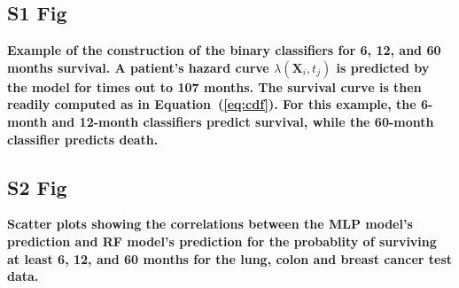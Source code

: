 \documentclass[10pt,letterpaper]{article}
\begin{document}
\subsection*{S1 Fig}
\label{S1_Fig}
{\bf Example of the construction of the binary classifiers for 6, 12, and 60 months survival.
A patient's hazard curve $\lambda(\mathbf{X}_{i}, t_{j})$ is predicted by the model for times out to 107 months. The survival curve is then readily computed as in Equation~(\ref{eq:cdf}). For this example, the 6-month and 12-month classifiers predict survival, while the 60-month classifier predicts death.}


\subsection*{S2 Fig}
\label{S2_Fig}
{\bf Scatter plots showing the correlations between the MLP model's prediction and RF model's prediction for the probablity of surviving at least 6, 12, and 60 months for the lung, colon and breast cancer test data.}
\end{document}
